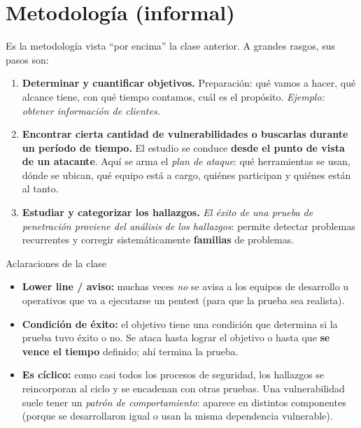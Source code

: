 \documentclass[11pt,a4paper]{article}
\begin{document}
\section{Metodología (informal)}

Es la metodología vista ``por encima'' la clase anterior. A grandes rasgos, sus pasos son:

\begin{enumerate}[leftmargin=1.8em,itemsep=3pt]
  \item \textbf{Determinar y cuantificar objetivos.} Preparación: qué vamos a hacer, qué
        alcance tiene, con qué tiempo contamos, cuál es el propósito.
        \emph{Ejemplo: obtener información de clientes.}
  \item \textbf{Encontrar cierta cantidad de vulnerabilidades o buscarlas durante un período
        de tiempo.} El estudio se conduce \textbf{desde el punto de vista de un atacante}.
        Aquí se arma el \emph{plan de ataque}: qué herramientas se usan, dónde se ubican, qué
        equipo está a cargo, quiénes participan y quiénes están al tanto.
  \item \textbf{Estudiar y categorizar los hallazgos.} \emph{El éxito de una prueba de
        penetración proviene del análisis de los hallazgos}: permite detectar problemas
        recurrentes y corregir sistemáticamente \textbf{familias} de problemas.
\end{enumerate}

\begin{notebox}{Aclaraciones de la clase}
\begin{itemize}[leftmargin=1.4em,itemsep=2pt]
  \item \textbf{Lower line / aviso:} muchas veces \emph{no} se avisa a los equipos de
        desarrollo u operativos que va a ejecutarse un pentest (para que la prueba sea
        realista).
  \item \textbf{Condición de éxito:} el objetivo tiene una condición que determina si la
        prueba tuvo éxito o no. Se ataca hasta lograr el objetivo o hasta que \textbf{se vence
        el tiempo} definido; ahí termina la prueba.
  \item \textbf{Es cíclico:} como casi todos los procesos de seguridad, los hallazgos se
        reincorporan al ciclo y se encadenan con otras pruebas. Una vulnerabilidad suele tener
        un \emph{patrón de comportamiento}: aparece en distintos componentes (porque se
        desarrollaron igual o usan la misma dependencia vulnerable).
\end{itemize}
\end{notebox}
\end{document}
